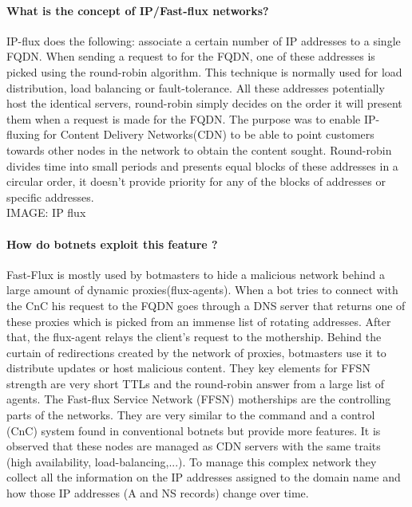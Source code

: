 \paragraph{What is the concept of IP/Fast-flux networks?} IP-flux does the following: associate a certain number of IP addresses to a single FQDN. When sending a request to for the FQDN, one of these addresses is picked using the round-robin algorithm. This technique is normally used for load distribution, load balancing or fault-tolerance. All these addresses potentially host the identical servers, round-robin simply decides on the order it will present them when a request is made for the FQDN. The purpose was to enable IP-fluxing for Content Delivery Networks(CDN) to be able to point customers towards other nodes in the network to obtain the content sought.\cite{robin_dns} Round-robin divides time into small periods and presents equal blocks of these addresses in a circular order, it doesn't provide priority for any of the blocks of addresses or specific addresses.\cite{robin}\\

IMAGE: IP flux

\paragraph{How do botnets exploit this feature ?}
Fast-Flux is mostly used by botmasters to hide a malicious network behind a large amount of dynamic proxies(flux-agents).\cite{ff1} When a bot tries to connect with the CnC his request to the FQDN goes through a DNS server that returns one of these proxies which is picked from an immense list of rotating addresses. After that, the flux-agent relays the client's request to the mothership.\cite{wiki_ff} Behind the curtain of redirections created by the network of proxies, botmasters use it to distribute updates or host malicious content. They key elements for FFSN strength are very short TTLs and the round-robin answer from a large list of agents\cite{hybrid}\cite{tracking2}.
The Fast-flux Service Network (FFSN) motherships are the controlling parts of the networks. They are very similar to the command and a control (CnC) system found in conventional botnets but provide more features. It is observed that these nodes are managed as CDN servers with the same traits (high availability, load-balancing,...). To manage this complex network they collect all the information on the IP addresses assigned to the domain name and how those IP addresses (A and NS records) change over time.\cite{bot-com}\cite{detection3}

